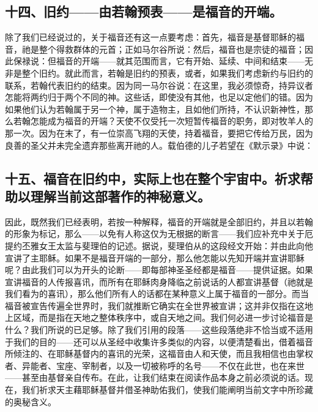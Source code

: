 
\subsection{十四、旧约——由若翰预表——是福音的开端。}

除了我们已经说过的，关于福音还有这一点要考虑：首先，福音是基督耶稣的福音，祂是整个得救群体的元首；正如马尔谷所说：然后，福音也是宗徒的福音；因此保禄说：但福音的开端——就其范围而言，它有开始、延续、中间和结束——无非是整个旧约。就此而言，若翰是旧约的预表，或者，如果我们考虑新约与旧约的联系，若翰代表旧约的结束。因为同一马尔谷说：在这里，我必须惊奇，持异议者怎能将两约归于两个不同的神。这些话，即使没有其他，也足以定他们的错。因为如果他们认为若翰属于另一个神，属于造物主，且如他们所持，不认识新神性，那么若翰怎能成为福音的开端？天使不仅受托一次短暂传福音的职务，即对牧羊人的那一次。因为在末了，有一位崇高飞翔的天使，持着福音，要把它传给万民，因为良善的圣父并未完全遗弃那些离开祂的人。载伯德的儿子若望在《默示录》中说：\par


\subsection{十五、福音在旧约中，实际上也在整个宇宙中。祈求帮助以理解当前这部著作的神秘意义。}

因此，既然我们已经表明，若按一种解释，福音的开端就是全部旧约，并且以若翰的形象为标记，那么——以免有人称这仅为无根据的断言——我们应补充中关于厄提约丕雅女王太监与斐理伯的记述。据说，斐理伯从的这段经文开始：并由此向他宣讲了主耶稣。如果不是福音开端的一部分，那么他怎能以先知开端并宣讲耶稣呢？由此我们可以为开头的论断——即每部神圣圣经都是福音——提供证据。如果宣讲福音的人传报喜讯，而所有在耶稣肉身降临之前说话的人都宣讲基督（祂就是我们看为的喜讯），那么他们所有人的话都在某种意义上属于福音的一部分。而当福音被宣告传遍全世界时，我们就推断它确实在全世界被宣讲；这并非仅指在这地上区域，而是指在天地之整体秩序中，或自天地之间。我们何必进一步讨论福音是什么？我们所说的已足够。除了我们引用的段落——这些段落绝非不恰当或不适用于我们的目的——还可以从圣经中收集许多类似的内容，以便清楚看出，借着福音所倾注的、在耶稣基督内的喜讯的光荣，这福音由人和天使，而且我相信也由掌权者、异能者、宝座、宰制者，以及一切被称呼的名号——不仅在此世，也在来世——甚至由基督亲自传布。在此，让我们结束在阅读作品本身之前必须说的话。现在，我们祈求天主藉耶稣基督并借圣神助佑我们，使我们能阐明当前文字中所珍藏的奥秘含义。\par

